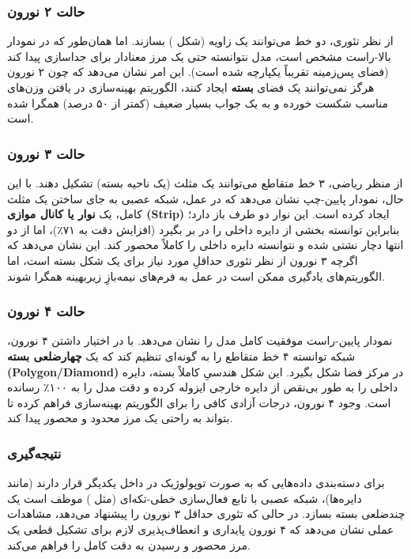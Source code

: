 \documentclass{article}
\begin{document}
\subsubsection{حالت ۲ نورون}
از نظر تئوری، دو خط می‌توانند یک زاویه (شکل ) بسازند. اما همان‌طور که در نمودار بالا-راست مشخص است، مدل نتوانسته حتی یک مرز معنادار برای جداسازی پیدا کند (فضای پس‌زمینه تقریباً یکپارچه شده است). این امر نشان می‌دهد که چون ۲ نورون هرگز نمی‌توانند یک فضای \textbf{بسته} ایجاد کنند، الگوریتم بهینه‌سازی در یافتن وزن‌های مناسب شکست خورده و به یک جواب بسیار ضعیف (کمتر از ۵۰ درصد) همگرا شده است.

\subsubsection{حالت ۳ نورون}
از منظر ریاضی، ۳ خط متقاطع می‌توانند یک مثلث (یک ناحیه بسته) تشکیل دهند. با این حال، نمودار پایین-چپ نشان می‌دهد که در عمل، شبکه عصبی به جای ساختن یک مثلث کامل، یک \textbf{نوار یا کانال موازی (Strip)} ایجاد کرده است. این نوار دو طرف باز دارد؛ بنابراین توانسته بخشی از دایره داخلی را در بر بگیرد (افزایش دقت به ۷۱٪)، اما از دو انتها دچار نشتی شده و نتوانسته دایره داخلی را کاملاً محصور کند. این نشان می‌دهد که اگرچه ۳ نورون از نظر تئوری حداقلِ مورد نیاز برای یک شکل بسته است، اما الگوریتم‌های یادگیری ممکن است در عمل به فرم‌های نیمه‌بازِ زیربهینه همگرا شوند.

\subsubsection{حالت ۴ نورون}
نمودار پایین-راست موفقیت کامل مدل را نشان می‌دهد. با در اختیار داشتن ۴ نورون، شبکه توانسته ۴ خط متقاطع را به گونه‌ای تنظیم کند که یک \textbf{چهارضلعی بسته (Polygon/Diamond)} در مرکز فضا شکل بگیرد. این شکل هندسیِ کاملاً بسته، دایره داخلی را به طور بی‌نقص از دایره خارجی ایزوله کرده و دقت مدل را به ۱۰۰٪ رسانده است. وجود ۴ نورون، درجات آزادی  کافی را برای الگوریتم بهینه‌سازی فراهم کرده تا بتواند به راحتی یک مرز محدود و محصور پیدا کند.

\subsubsection{نتیجه‌گیری}
برای دسته‌بندی داده‌هایی که به صورت توپولوژیک در داخل یکدیگر قرار دارند (مانند دایره‌ها)، شبکه عصبی با تابع فعال‌سازی خطی-تکه‌ای (مثل ) موظف است یک چندضلعی بسته بسازد. در حالی که تئوری حداقل ۳ نورون را پیشنهاد می‌دهد، مشاهدات عملی نشان می‌دهد که ۴ نورون پایداری و انعطاف‌پذیری لازم برای تشکیل قطعی یک مرز محصور و رسیدن به دقت کامل را فراهم می‌کند.
\end{document}
